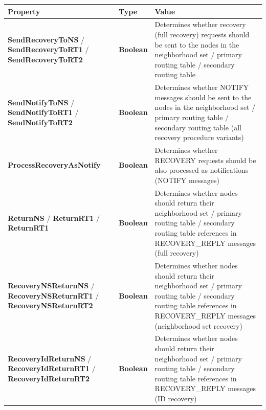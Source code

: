 \begin{table}
\scriptsize
\begin{center}
\begin{tabular}{p{5cm} p{1.5cm} p{8.0cm}}
	\hline
	\textbf{Property}							& \textbf{Type}					& \textbf{Value}					\\[1mm]
    \hline
	\textbf{SendRecoveryToNS} \newline / \textbf{SendRecoveryToRT1} \newline / \textbf{SendRecoveryToRT2}				& \textbf{Boolean}				& Determines whether recovery (full recovery) requests should be sent to the nodes in the neighborhood set / primary routing table / secondary routing table							\\[1.5mm]	
	\textbf{SendNotifyToNS}	\newline / \textbf{SendNotifyToRT1} \newline / \textbf{SendNotifyToRT2}						& \textbf{Boolean}				& Determines whether NOTIFY	messages should be sent to the nodes in the neighborhood set / primary routing table / secondary routing table (all recovery procedure variants)			\\[1.5mm]	
	\textbf{ProcessRecoveryAsNotify}																					& \textbf{Boolean}				& Determines whether RECOVERY requests should be also processed as notifications (NOTIFY messages)							\\[1.5mm]	
	\textbf{ReturnNS} \newline / \textbf{ReturnRT1} \newline / \textbf{ReturnRT1}										& \textbf{Boolean}				& Determines whether nodes should return their neighborhood set / primary routing table / secondary routing table references in RECOVERY\_REPLY messages	(full recovery)								\\[1.5mm]	
	\textbf{RecoveryNSReturnNS} \newline / \textbf{RecoveryNSReturnRT1} \newline / \textbf{RecoveryNSReturnRT2}			& \textbf{Boolean}				& Determines whether nodes should return their neighborhood set / primary routing table / secondary routing table references in RECOVERY\_REPLY messages	(neighborhood set recovery)							\\[1.5mm]	
	\textbf{RecoveryIdReturnNS} \newline / \textbf{RecoveryIdReturnRT1} \newline / \textbf{RecoveryIdReturnRT2}			& \textbf{Boolean}				& Determines whether nodes should return their neighborhood set / primary routing table / secondary routing table references in RECOVERY\_REPLY messages	(ID recovery)							\\[1.5mm]	

\end{tabular}
\end{center}
\end{table}

